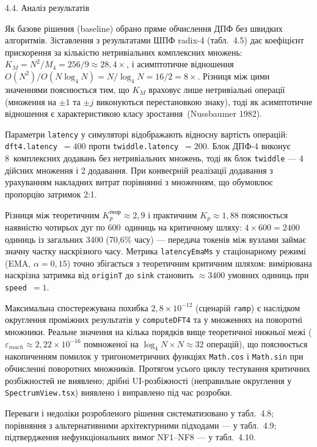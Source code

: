 \protect{}\label{_Toc229681174}{}4.4. Аналіз результатів

Як базове рішення (baseline) обрано пряме обчислення ДПФ без швидких
алгоритмів. Зіставлення з результатами ШПФ radix-4 (табл.~4.5) дає
коефіцієнт прискорення за кількістю нетривіальних комплексних множень:
\(K_M=N^2/M_4=256/9\approx28{,}4\times\), і асимптотичне відношення
\(O(N^2)/O(N\log_4 N)=N/\log_4 N=16/2=8\times\). Різниця між цими
значеннями пояснюється тим, що \(K_M\) враховує лише нетривіальні
операції (множення на \(\pm1\) та \(\pm j\) виконуються перестановкою
знаку), тоді як асимптотичне відношення є характеристикою класу
зростання~(Nussbaumer 1982).

Параметри \texttt{latency} у симуляторі відображають відносну вартість
операцій: \texttt{dft4.latency}~\(=400\) проти
\texttt{twiddle.latency}~\(=200\). Блок ДПФ-4 виконує 8~комплексних
додавань без нетривіальних множень, тоді як блок \texttt{twiddle} ---
4 дійсних множення і 2 додавання. При конвеєрній реалізації додавання з
урахуванням накладних витрат порівнянні з множенням, що обумовлює
пропорцію затримок 2:1.

Різниця між теоретичним \(K_p^{теор}\approx2{,}9\) і практичним
\(K_p\approx1{,}88\) пояснюється наявністю чотирьох дуг по 600~одиниць
на критичному шляху: \(4\times600=2400\) одиниць із загальних 3400
(70{,}6\% часу) --- передача токенів між вузлами займає значну частку
наскрізного часу. Метрика \texttt{latencyEmaMs} у стаціонарному режимі
(EMA, \(\alpha=0{,}15\)) точно збігається з теоретичним критичним
шляхом: вимірювана наскрізна затримка від \texttt{originT} до
\texttt{sink} становить \(\approx3400\) умовних одиниць при
\texttt{speed}~\(=1\).

Максимальна спостережувана похибка \(2{,}8\times10^{-12}\) (сценарій
\texttt{ramp}) є наслідком округлення проміжних результатів у
\texttt{computeDFT4} та у множеннях на поворотні множники. Реальне
значення на кілька порядків вище теоретичної нижньої межі
(\(\varepsilon_{mach}\approx2{,}22\times10^{-16}\) помноженої на
\(\log_4N\times N\approx32\) операцій), що пояснюється накопиченням
помилок у тригонометричних функціях \texttt{Math.cos} і \texttt{Math.sin}
при обчисленні поворотних множників. Протягом усього циклу тестування
критичних розбіжностей не виявлено; дрібні UI-розбіжності (неправильне
округлення у \texttt{SpectrumView.tsx}) виявлено і виправлено під час
розробки.

Переваги і недоліки розробленого рішення систематизовано у табл.~4.8;
порівняння з альтернативними архітектурними підходами --- у табл.~4.9;
підтвердження нефункціональних вимог NF1--NF8 --- у табл.~4.10.

